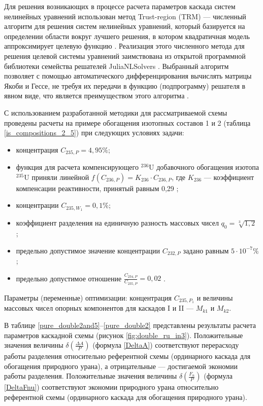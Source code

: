 Для решения возникающих в процессе расчета параметров каскада систем нелинейных уравнений использован метод Trust-region (TRM) --- численный алгоритм для решения систем нелинейных уравнений, который базируется на определении области вокруг лучшего решения, в котором квадратичная модель аппроксимирует целевую функцию \cite{NumericalOptimization2006}. Реализация этого численного метода для решения целевой системы уравнений заимствована из открытой программной библиотеки семейства решателей JuliaNLSolvers \cite{mogensenJuliaNLSolversNLsolveJl2020}. Выбранный алгоритм позволяет с помощью автоматического дифференцирования вычислять матрицы Якоби и Гессе, не требуя их передачи в функцию (подпрограмму) решателя в явном виде, что является преимуществом этого алгоритма \cite{айда-задеБыстроеАвтоматическоеДифференцирование1989,revelsForwardModeAutomaticDifferentiation2016}.

С использованием разработанной методики для рассматриваемой схемы проведены расчеты на примере обогащения изотопных составов 1 и 2 (таблица \ref{is_compositions_2_5}) при следующих условиях задачи:

\begin{itemize}
    \item концентрация $C_{235,{P}} = {4,95\%}$; 
    \item функция для расчета компенсирующего $^{236}$U добавочного обогащения изотопа $^{235}$U приняли линейной $f(C_{236,P}) = {K_{236}\cdot{C_{236,{P}}}}$, где $K_{236}$ --- коэффициент компенсации реактивности, принятый равным 0,29 \cite{smirnovEvolutionIsotopicComposition2012};
    \item концентрации $C_{235,{W_1}} = 0,1\%$;
    \item коэффициент разделения на единичную разность массовых чисел $q_{0} = \sqrt[3]{1,2}$ \cite{smirnovEvolutionIsotopicComposition2012};
    \item предельно допустимое значение концентрации $C_{232,{P}}$ задано равным $5 \cdot10^{-7} \%$;
    \item предельно допустимое отношение $\frac{C_{234,{P}}}{C_{235,{P}}} = 0,02$ \cite{2024smirnovObogashchenieRegenerirovannogoUrana2018}. 
\end{itemize}

Параметры (переменные) оптимизации: концентрация $C_{235,{P_1}}$ и величины массовых чисел опорных компонентов для каскадов I и II --- $M_{k1}$ и $M_{k2}$.

В таблице \ref{pure_double2and5}--\ref{pure_double2} представлены результаты расчета параметров каскадной схемы (рисунок \ref{fig:double_ru_in3}). Положительные значения величины $\delta(\frac{\Delta A}{P})$ (формула \ref{DeltaA}) соответствуют перерасходу работы разделения относительно референтной схемы (ординарного каскада для обогащения природного урана), а отрицательные --- достигаемой экономии работы разделения. Положительные значения величины $\delta(\frac{F_n}{P})$ (формула \ref{DeltaFnu}) соответствуют экономии природного урана относительно референтной схемы (ординарного каскада для обогащения природного урана).

